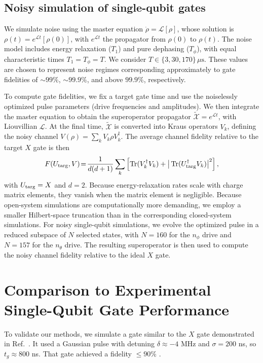 \subsection{Noisy simulation of single-qubit gates}\label{zp:app:sub_sec_noisy_1Q}
We simulate noise using the master equation $\dot\rho=\mathcal{L}[\rho]$, whose solution is $\rho(t)=e^{\mathcal{L}t}[\rho(0)]$, with $e^{\mathcal{L}t}$ the propagator from $\rho(0)$ to $\rho(t)$.
The noise model includes energy relaxation ($T_1$) and pure dephasing ($T_\phi$), with equal characteristic times $T_1=T_\phi=T$.
We consider $T\in\{3,30,170\}\,\mu\mathrm{s}$.
These values are chosen to represent noise regimes corresponding approximately to gate fidelities of $\sim99\%$, $\sim99.9\%$, and above $99.9\%$, respectively.

To compute gate fidelities, we fix a target gate time and use the noiselessly optimized pulse parameters (drive frequencies and amplitudes).
We then integrate the master equation to obtain the superoperator propagator $\tilde{\mathcal{X}}=e^{\mathcal{L}t}$, with Liouvillian $\mathcal{L}$.
At the final time, $\tilde{\mathcal{X}}$ is converted into Kraus operators $V_k$, defining the noisy channel $V(\rho)=\sum_k V_k \rho V_k^\dagger$.
The average channel fidelity relative to the target $X$ gate is then
\begin{equation}
F(U_{\rm targ},V)
\!=\!
\frac{1}{d(d+1)}
\displaystyle
\sum_k \left[
\operatorname{Tr}(V_k^\dagger V_k) +
\big| \operatorname{Tr}(U_{\rm targ}^\dagger V_k)
\big|^2 \right],
\label{zp:eq:channel_fidelity}
\end{equation}
with $U_{\rm targ}=X$ and $d=2$.
Because energy-relaxation rates scale with charge matrix elements, they vanish when the matrix element is negligible.
Because open-system simulations are computationally more demanding, we employ a smaller Hilbert-space truncation than in the corresponding closed-system simulations.
For noisy single-qubit simulations, we evolve the optimized pulse in a reduced subspace of $N$ selected states, with $N=160$ for the $n_\phi$ drive and $N=157$ for the $n_\theta$ drive.
The resulting superoperator is then used to compute the noisy channel fidelity relative to the ideal $X$ gate.

\section{Comparison to Experimental Single-Qubit Gate Performance}
\label{zp:sec:x_gate_reproduce}

To validate our methods, we simulate a gate similar to the $X$ gate demonstrated in Ref.~\cite{Gyenis_zero_pi_2021a}.
It used a Gaussian pulse with detuning $\delta\approx-4$ MHz and $\sigma=200$ ns, so $t_g\approx800$ ns.
That gate achieved a fidelity $\leq90\%$ \cite{andras_xgate}.

